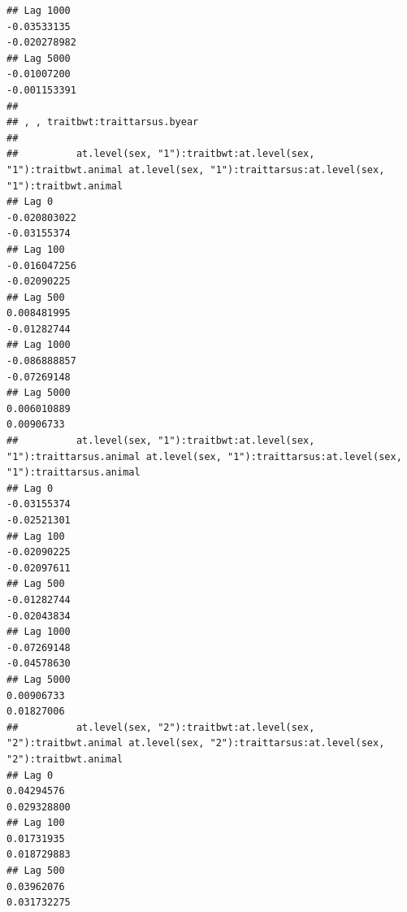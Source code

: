 \documentclass[
  12pt,
]{book}
\begin{document}
\begin{verbatim}
## Lag 1000                                                      -0.03533135                                                        -0.020278982
## Lag 5000                                                      -0.01007200                                                        -0.001153391
## 
## , , traitbwt:traittarsus.byear
## 
##          at.level(sex, "1"):traitbwt:at.level(sex, "1"):traitbwt.animal at.level(sex, "1"):traittarsus:at.level(sex, "1"):traitbwt.animal
## Lag 0                                                      -0.020803022                                                       -0.03155374
## Lag 100                                                    -0.016047256                                                       -0.02090225
## Lag 500                                                     0.008481995                                                       -0.01282744
## Lag 1000                                                   -0.086888857                                                       -0.07269148
## Lag 5000                                                    0.006010889                                                        0.00906733
##          at.level(sex, "1"):traitbwt:at.level(sex, "1"):traittarsus.animal at.level(sex, "1"):traittarsus:at.level(sex, "1"):traittarsus.animal
## Lag 0                                                          -0.03155374                                                          -0.02521301
## Lag 100                                                        -0.02090225                                                          -0.02097611
## Lag 500                                                        -0.01282744                                                          -0.02043834
## Lag 1000                                                       -0.07269148                                                          -0.04578630
## Lag 5000                                                        0.00906733                                                           0.01827006
##          at.level(sex, "2"):traitbwt:at.level(sex, "2"):traitbwt.animal at.level(sex, "2"):traittarsus:at.level(sex, "2"):traitbwt.animal
## Lag 0                                                        0.04294576                                                       0.029328800
## Lag 100                                                      0.01731935                                                       0.018729883
## Lag 500                                                      0.03962076                                                       0.031732275

\end{verbatim}
\end{document}
